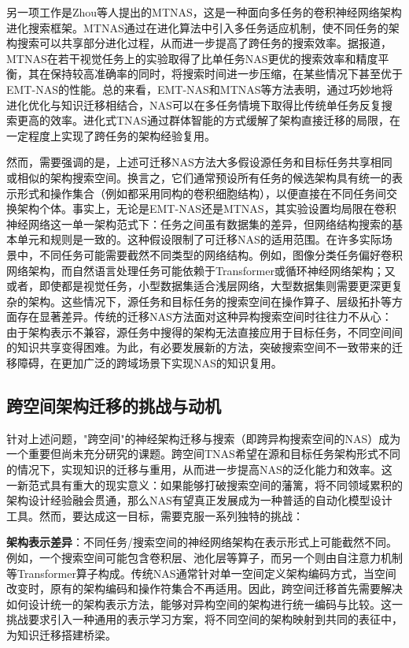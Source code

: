 \documentclass[../main.tex]{subfiles}
\begin{document}
另一项工作是Zhou等人提出的MTNAS，这是一种面向多任务的卷积神经网络架构进化搜索框架。MTNAS通过在进化算法中引入多任务适应机制，使不同任务的架构搜索可以共享部分进化过程，从而进一步提高了跨任务的搜索效率。据报道，MTNAS在若干视觉任务上的实验取得了比单任务NAS更优的搜索效率和精度平衡，其在保持较高准确率的同时，将搜索时间进一步压缩，在某些情况下甚至优于EMT-NAS的性能。总的来看，EMT-NAS和MTNAS等方法表明，通过巧妙地将进化优化与知识迁移相结合，NAS可以在多任务情境下取得比传统单任务反复搜索更高的效率。进化式TNAS通过群体智能的方式缓解了架构直接迁移的局限，在一定程度上实现了跨任务的架构经验复用。

然而，需要强调的是，上述可迁移NAS方法大多假设源任务和目标任务共享相同或相似的架构搜索空间。换言之，它们通常预设所有任务的候选架构具有统一的表示形式和操作集合（例如都采用同构的卷积细胞结构），以便直接在不同任务间交换架构个体。事实上，无论是EMT-NAS还是MTNAS，其实验设置均局限在卷积神经网络这一单一架构范式下：任务之间虽有数据集的差异，但网络结构搜索的基本单元和规则是一致的。这种假设限制了可迁移NAS的适用范围。在许多实际场景中，不同任务可能需要截然不同类型的网络结构。例如，图像分类任务偏好卷积网络架构，而自然语言处理任务可能依赖于Transformer或循环神经网络架构；又或者，即使都是视觉任务，小型数据集适合浅层网络，大型数据集则需要更深更复杂的架构。这些情况下，源任务和目标任务的搜索空间在操作算子、层级拓扑等方面存在显著差异。传统的迁移NAS方法面对这种异构搜索空间时往往力不从心：由于架构表示不兼容，源任务中搜得的架构无法直接应用于目标任务，不同空间间的知识共享变得困难。为此，有必要发展新的方法，突破搜索空间不一致带来的迁移障碍，在更加广泛的跨域场景下实现NAS的知识复用。

\subsection{跨空间架构迁移的挑战与动机}

针对上述问题，"跨空间"的神经架构迁移与搜索（即跨异构搜索空间的NAS）成为一个重要但尚未充分研究的课题。跨空间TNAS希望在源和目标任务架构形式不同的情况下，实现知识的迁移与重用，从而进一步提高NAS的泛化能力和效率。这一新范式具有重大的现实意义：如果能够打破搜索空间的藩篱，将不同领域累积的架构设计经验融会贯通，那么NAS有望真正发展成为一种普适的自动化模型设计工具。然而，要达成这一目标，需要克服一系列独特的挑战：

\textbf{架构表示差异}：不同任务/搜索空间的神经网络架构在表示形式上可能截然不同。例如，一个搜索空间可能包含卷积层、池化层等算子，而另一个则由自注意力机制等Transformer算子构成。传统NAS通常针对单一空间定义架构编码方式，当空间改变时，原有的架构编码和操作符集合不再适用。因此，跨空间迁移首先需要解决如何设计统一的架构表示方法，能够对异构空间的架构进行统一编码与比较。这一挑战要求引入一种通用的表示学习方案，将不同空间的架构映射到共同的表征中，为知识迁移搭建桥梁。
\end{document}

